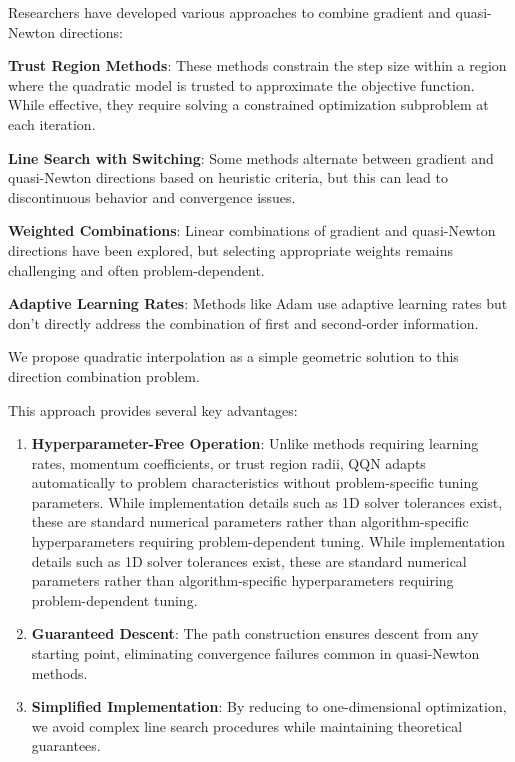 Researchers have developed various approaches to combine gradient and quasi-Newton directions:

\textbf{Trust Region Methods}: These methods constrain the step size within a region where the quadratic model is trusted to approximate the objective function. While effective, they require solving a constrained optimization subproblem at each iteration.

\textbf{Line Search with Switching}: Some methods alternate between gradient and quasi-Newton directions based on heuristic criteria, but this can lead to discontinuous behavior and convergence issues.

\textbf{Weighted Combinations}: Linear combinations of gradient and quasi-Newton directions have been explored, but selecting appropriate weights remains challenging and often problem-dependent.

\textbf{Adaptive Learning Rates}: Methods like Adam use adaptive learning rates but don't directly address the combination of first and second-order information.

We propose quadratic interpolation as a simple geometric solution to this direction combination problem.

This approach provides several key advantages:

\begin{enumerate}
\def\labelenumi{\arabic{enumi}.}
\item
  \textbf{Hyperparameter-Free Operation}: Unlike methods requiring learning rates, momentum coefficients, or trust region radii, QQN adapts automatically to problem characteristics without problem-specific tuning parameters.
  While implementation details such as 1D solver tolerances exist, these are standard numerical parameters rather than algorithm-specific hyperparameters requiring problem-dependent tuning.
  While implementation details such as 1D solver tolerances exist, these are standard numerical parameters rather than algorithm-specific hyperparameters requiring problem-dependent tuning.
\item
  \textbf{Guaranteed Descent}: The path construction ensures descent from any starting point, eliminating convergence failures common in quasi-Newton methods.
\item
  \textbf{Simplified Implementation}: By reducing to one-dimensional optimization, we avoid complex line search procedures while maintaining theoretical guarantees.
\end{enumerate}

